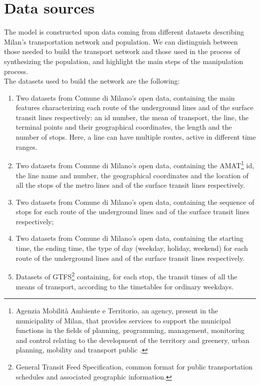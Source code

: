 
\section{Data sources}\label{sec:3.1}
The model is constructed upon data coming from different datasets describing Milan's transportation network and population. We can distinguish between those needed to build the transport network and those used in the process of synthesizing the population, and highlight the main steps of the manipulation process.\\
The datasets used to build the network are the following:
\begin{enumerate} 
    \item Two datasets \cite{site1, site5} from Comune di Milano's open data, containing the main features characterizing each route of the underground lines and of the surface transit lines respectively: an id number, the mean of transport, the line, the terminal points and their geographical coordinates, the length and the number of stops. Here, a line can have multiple routes, active in different time ranges. \\ 
    \item Two datasets \cite{site2, site6} from Comune di Milano's open data, containing the AMAT\footnote{Agenzia Mobilità Ambiente e Territorio, an agency, present in the municipality of Milan, that provides services to support the municipal functions in the fields of planning, programming, management, monitoring and control relating to the development of the territory and greenery, urban planning, mobility and transport public \cite{site21}.} id, the line name and number, the geographical coordinates and the location of all the stops of the metro lines and of the surface transit lines respectively.
    \item Two datasets \cite{site3, site7} from Comune di Milano's open data, containing the sequence of stops for each route of the underground lines and of the surface transit lines respectively;
    \item Two datasets \cite{site4, site8} from Comune di Milano's open data, containing the starting time, the ending time, the type of day (weekday, holiday, weekend) for each route of the underground lines and  of the surface transit lines respectively. 
    \item Datasets \cite{site12} of GTFS\footnote{General Transit Feed Specification, common format for public transportation schedules and associated geographic information.} containing, for each stop, the transit times of all the means of transport, according to the timetables for ordinary weekdays. 

\end{enumerate}
